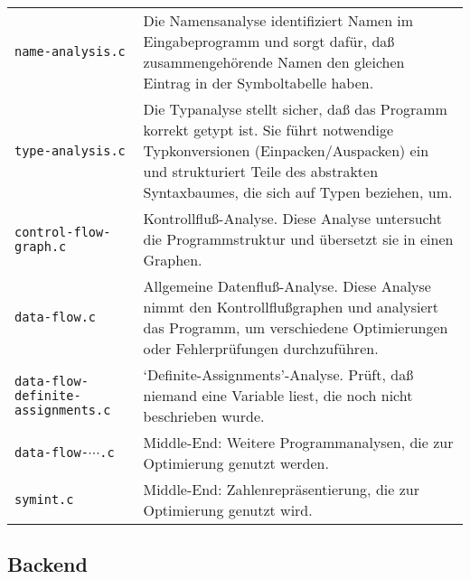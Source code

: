 \documentclass[11pt,a4paper]{article}
\begin{document}
\begin{tabular}{p{4cm}p{12cm}}
\texttt{name-analysis.c} & Die Namensanalyse identifiziert Namen im Eingabeprogramm und sorgt dafür, daß zusammengehörende Namen den gleichen Eintrag in der Symboltabelle haben.\\
\texttt{type-analysis.c} & Die Typanalyse stellt sicher, daß das Programm korrekt getypt ist.  Sie führt notwendige Typkonversionen (Einpacken/Auspacken) ein und
strukturiert Teile des abstrakten Syntaxbaumes, die sich auf Typen beziehen, um. \\
\texttt{control-flow-graph.c} & Kontrollfluß-Analyse.  Diese Analyse untersucht die Programmstruktur und übersetzt sie in einen Graphen. \\
\texttt{data-flow.c} & Allgemeine Datenfluß-Analyse.  Diese Analyse nimmt den Kontrollflußgraphen und analysiert das Programm, um verschiedene Optimierungen oder Fehlerprüfungen durchzuführen. \\
\texttt{data-flow-definite-assignments.c} & `Definite-Assignments'-Analyse.  Prüft, daß niemand eine Variable liest, die noch nicht beschrieben wurde.\\
\texttt{data-flow-$\cdots$.c} & Middle-End: Weitere Programmanalysen, die zur Optimierung genutzt werden. \\
\texttt{symint.c} & Middle-End: Zahlenrepräsentierung, die zur Optimierung genutzt wird. \\
\end{tabular}


\subsection{Backend}
\end{document}
